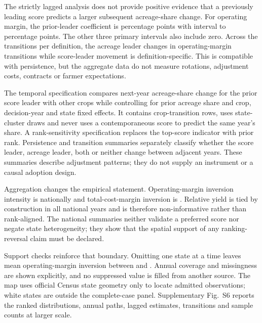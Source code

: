 The strictly lagged analysis does not provide positive evidence that a previously leading score predicts a larger subsequent acreage-share change. For operating margin, the prior-leader coefficient is \LaggedOperatingContrast{} percentage points with interval \LaggedOperatingLow{} to \LaggedOperatingHigh{} percentage points. The other three primary intervals also include zero. Across the \TransitionsPerDefinition{} transitions per definition, the acreage leader changes in \AcreageTopChanges{} operating-margin transitions while score-leader movement is definition-specific. This is compatible with persistence, but the aggregate data do not measure rotations, adjustment costs, contracts or farmer expectations.

The temporal specification compares next-year acreage-share change for the prior score leader with other crops while controlling for prior acreage share and crop, decision-year and state fixed effects. It contains \CropTransitionRows{} crop-transition rows, uses \BootstrapReplications{} state-cluster draws and never uses a contemporaneous score to predict the same year's share. A rank-sensitivity specification replaces the top-score indicator with prior rank. Persistence and transition summaries separately classify whether the score leader, acreage leader, both or neither change between adjacent years. These summaries describe adjustment patterns; they do not supply an instrument or a causal adoption design.

Aggregation changes the empirical statement. Operating-margin inversion intensity is \NationalOperatingInversion{} nationally and total-cost-margin inversion is \NationalTotalCostInversion{}. Relative yield is tied by construction in all \NationalRelativeYieldTies{} national years and is therefore non-informative rather than rank-aligned. The national summaries neither validate a preferred score nor negate state heterogeneity; they show that the spatial support of any ranking-reversal claim must be declared.

Support checks reinforce that boundary. Omitting one state at a time leaves mean operating-margin inversion between \LosoOperatingMin{} and \LosoOperatingMax{}. Annual coverage and missingness are shown explicitly, and no suppressed value is filled from another source. The map uses official Census state geometry only to locate admitted observations; white states are outside the complete-case panel. Supplementary Fig.~S6 reports the ranked distributions, annual paths, lagged estimates, transitions and sample counts at larger scale.

